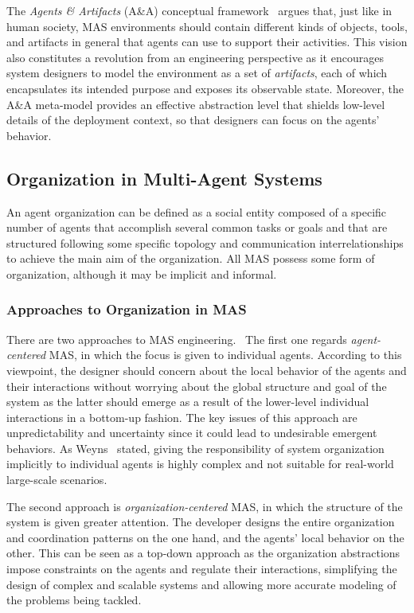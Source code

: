 The \textit{Agents \& Artifacts} (A\&A) conceptual framework~\cite{ricci2007artifacts} argues that, just like in human society, MAS environments should contain different kinds of objects, tools, and artifacts in general that agents can use to support their activities.
This vision also constitutes a revolution from an engineering perspective as it encourages system designers to model the environment as a set of \textit{artifacts}, each of which encapsulates its intended purpose and exposes its observable state.
Moreover, the A\&A meta-model provides an effective abstraction level that shields low-level details of the deployment context, so that designers can focus on the agents' behavior.

\subsection{Organization in Multi-Agent Systems}
An agent organization can be defined as a social entity composed of a specific number of agents that accomplish several common tasks or goals and that are structured following some specific topology and communication interrelationships to achieve the main aim of the organization.
All MAS possess some form of organization, although it may be implicit and informal.

\subsubsection{Approaches to Organization in MAS}
There are two approaches to MAS engineering.~\cite{Ahmed_Abbas_2015}
The first one regards \textit{agent-centered} MAS, in which the focus is given to individual agents.
According to this viewpoint, the designer should concern about the local behavior of the agents and their interactions without worrying about the global structure and goal of the system as the latter should emerge as a result of the lower-level individual interactions in a bottom-up fashion.
The key issues of this approach are unpredictability and uncertainty since it could lead to undesirable emergent behaviors.
As Weyns~\cite{weyns2010organizations} stated, giving the responsibility of system organization implicitly to individual agents is highly complex and not suitable for real-world large-scale scenarios.

The second approach is \textit{organization-centered} MAS, in which the structure of the system is given greater attention.
The developer designs the entire organization and coordination patterns on the one hand, and the agents' local behavior on the other.
This can be seen as a top-down approach as the organization abstractions impose constraints on the agents and regulate their interactions, simplifying the design of complex and scalable systems and allowing more accurate modeling of the problems being tackled.

